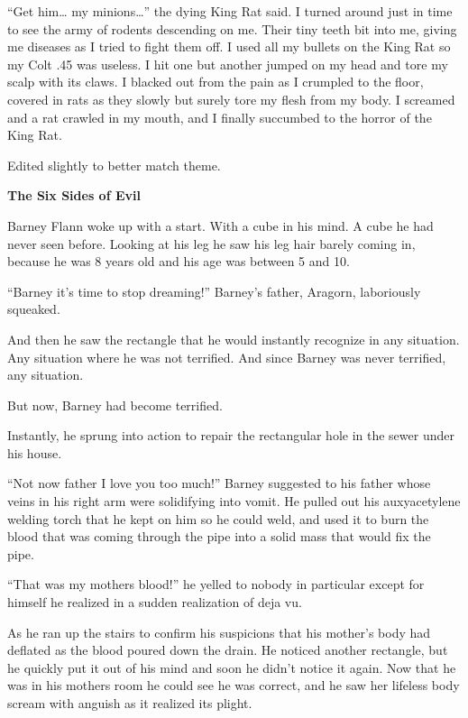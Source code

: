 ``Get him{\ldots} my minions{\ldots}'' the dying King Rat said. I turned around
just in time to see the army of rodents descending on me. Their
tiny teeth bit into me, giving me diseases as I tried to fight them
off. I used all my bullets on the King Rat so my Colt .45 was
useless. I hit one but another jumped on my head and tore my scalp
with its claws. I blacked out from the pain as I crumpled to the
floor, covered in rats as they slowly but surely tore my flesh from
my body. I screamed and a rat crawled in my mouth, and I finally
succumbed to the horror of the King Rat.







Edited slightly to better match theme. 

 





{\bf The Six Sides of Evil}

Barney Flann woke up with a start. With a cube in his mind. A cube
he had never seen before. Looking at his leg he saw his leg hair
barely coming in, because he was 8 years old and his age was
between 5 and 10.

``Barney it's time to stop dreaming!'' Barney's father, Aragorn,
laboriously squeaked.

And then he saw the rectangle that he would instantly recognize in
any situation. Any situation where he was not terrified. And since
Barney was never terrified, any situation.

But now, Barney had become terrified.

Instantly, he sprung into action to repair the rectangular hole in
the sewer under his house.

``Not now father I love you too much!'' Barney suggested to his
father whose veins in his right arm were solidifying into vomit. He
pulled out his auxyacetylene welding torch that he kept on him so
he could weld, and used it to burn the blood that was coming
through the pipe into a solid mass that would fix the pipe.

``That was my mothers blood!'' he yelled to nobody in particular
except for himself he realized in a sudden realization of deja
vu.

As he ran up the stairs to confirm his suspicions that his mother's
body had deflated as the blood poured down the drain. He noticed
another rectangle, but he quickly put it out of his mind and soon
he didn't notice it again. Now that he was in his mothers room he
could see he was correct, and he saw her lifeless body scream with
anguish as it realized its plight.

